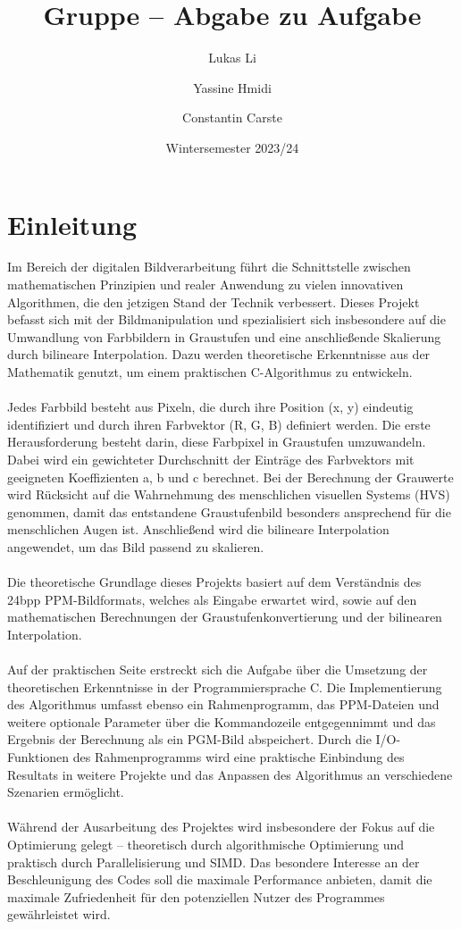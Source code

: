 \documentclass[course=erap]{aspdoc}
\author{Lukas Li \and Yassine Hmidi \and Constantin Carste}
\date{Wintersemester 2023/24} %
\title{Gruppe \theGroup{} -- Abgabe zu Aufgabe \theNumber}
\begin{document}
\maketitle

\section{Einleitung}
Im Bereich der digitalen Bildverarbeitung führt die Schnittstelle zwischen mathematischen Prinzipien und realer Anwendung zu vielen innovativen Algorithmen, die den jetzigen Stand der Technik verbessert. Dieses Projekt befasst sich mit der Bildmanipulation und spezialisiert sich insbesondere auf die Umwandlung von Farbbildern in Graustufen und eine anschließende Skalierung durch bilineare Interpolation. Dazu werden theoretische Erkenntnisse aus der Mathematik genutzt, um einem praktischen C-Algorithmus zu entwickeln.\\\\
Jedes Farbbild besteht aus Pixeln, die durch ihre Position (x, y) eindeutig identifiziert und durch ihren Farbvektor (R, G, B) definiert werden. Die erste Herausforderung besteht darin, diese Farbpixel in Graustufen umzuwandeln. Dabei wird ein gewichteter Durchschnitt der Einträge des Farbvektors mit geeigneten Koeffizienten a, b und c berechnet. Bei der Berechnung der Grauwerte wird Rücksicht auf die Wahrnehmung des menschlichen visuellen Systems (HVS) genommen, damit das entstandene Graustufenbild besonders ansprechend für die menschlichen Augen ist. Anschließend wird die bilineare Interpolation angewendet, um das Bild passend zu skalieren.\\\\
Die theoretische Grundlage dieses Projekts basiert auf dem Verständnis des 24bpp PPM-Bildformats, welches als Eingabe erwartet wird, sowie auf den mathematischen Berechnungen der Graustufenkonvertierung und der bilinearen Interpolation.\\\\
Auf der praktischen Seite erstreckt sich die Aufgabe über die Umsetzung der theoretischen Erkenntnisse in der Programmiersprache C. Die Implementierung des Algorithmus umfasst ebenso ein Rahmenprogramm, das PPM-Dateien und weitere optionale Parameter über die Kommandozeile entgegennimmt und das Ergebnis der Berechnung als ein PGM-Bild abspeichert. Durch die I/O-Funktionen des Rahmenprogramms wird eine praktische Einbindung des Resultats in weitere Projekte und das Anpassen des Algorithmus an verschiedene Szenarien ermöglicht.\\\\
Während der Ausarbeitung des Projektes wird insbesondere der Fokus auf die Optimierung gelegt – theoretisch durch algorithmische Optimierung und praktisch durch Parallelisierung und SIMD. Das besondere Interesse an der Beschleunigung des Codes soll die maximale Performance anbieten, damit die maximale Zufriedenheit für den potenziellen Nutzer des Programmes gewährleistet wird.
\end{document}
